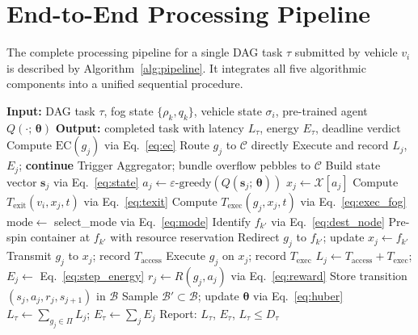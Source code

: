 \documentclass[12pt,a4paper]{article}
\theoremstyle{definition}
\theoremstyle{remark}
\begin{document}
\section{End-to-End Processing Pipeline}
\label{sec:pipeline}

The complete processing pipeline for a single DAG task $\tau$ submitted by
vehicle $v_i$ is described by Algorithm~\ref{alg:pipeline}. It integrates
all five algorithmic components into a unified sequential procedure.

\begin{algorithm}[H]
\caption{PCNME End-to-End Task Processing}
\label{alg:pipeline}
\begin{algorithmic}[1]
\State \textbf{Input:} DAG task $\tau$, fog state $\{\rho_k, q_k\}$,
  vehicle state $\sigma_i$, pre-trained agent $Q(\cdot;\,\bm{\theta})$
\State \textbf{Output:} completed task with latency $L_\tau$, energy $E_\tau$,
  deadline verdict
  \State Compute $\mathrm{EC}(g_j)$ via Eq.~\eqref{eq:ec}
    \State Route $g_j$ to $\mathcal{C}$ directly 
    \State Execute and record $L_j$, $E_j$; \textbf{continue}
  \EndIf
    \State Trigger Aggregator; bundle overflow pebbles to $\mathcal{C}$
  \EndIf
  \State Build state vector $\mathbf{s}_j$ via Eq.~\eqref{eq:state}
  \State $a_j \leftarrow \varepsilon\text{-greedy}(Q(\mathbf{s}_j;\,\bm{\theta}))$
  \State $x_j \leftarrow \mathcal{X}[a_j]$ 
  \State Compute $T_{\text{exit}}(v_i, x_j, t)$ via Eq.~\eqref{eq:texit}
  \State Compute $T_{\text{exec}}(g_j, x_j, t)$ via Eq.~\eqref{eq:exec_fog}
  \State $\mathrm{mode} \leftarrow$ select\_mode via Eq.~\eqref{eq:mode}
    \State Identify $f_{k'}$ via Eq.~\eqref{eq:dest_node}
    \State Pre-spin container at $f_{k'}$ with resource reservation
    \State Redirect $g_j$ to $f_{k'}$; update $x_j \leftarrow f_{k'}$
  \EndIf
  \State Transmit $g_j$ to $x_j$; record $T_{\text{access}}$
  \State Execute $g_j$ on $x_j$; record $T_{\text{exec}}$
  \State $L_j \leftarrow T_{\text{access}} + T_{\text{exec}}$;
    $E_j \leftarrow$ Eq.~\eqref{eq:step_energy}
  \State $r_j \leftarrow R(g_j, a_j)$ via Eq.~\eqref{eq:reward}
  \State Store transition $(s_j, a_j, r_j, s_{j+1})$ in $\mathcal{B}$
  \State Sample $\mathcal{B}' \subset \mathcal{B}$; update $\bm{\theta}$ via
    Eq.~\eqref{eq:huber}
\EndFor
\State $L_\tau \leftarrow \sum_{g_j \in \Pi} L_j$;
  $E_\tau \leftarrow \sum_j E_j$
\State Report: $L_\tau$, $E_\tau$, $L_\tau \leq D_\tau$
\end{algorithmic}
\end{algorithm}
\end{document}
